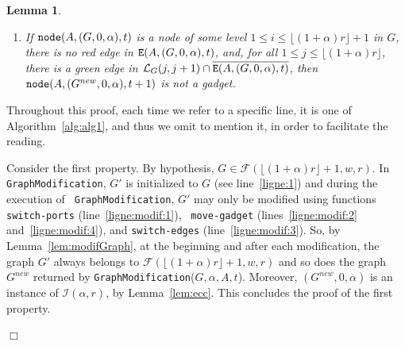 \documentclass[11pt]{article}
\newtheorem{lemma}{Lemma}[section]
\newcommand{\qed}{\hfill $\Box$ \bigbreak}
\newenvironment{proof}{\noindent {\bf Proof.}}{\qed}
\begin{document}
{\begin{lemma}
\begin{enumerate}
\item If ${\tt node}(A,(G,0,\alpha),t)$ is a node of some level
  $1\leq i\leq\lfloor(1+\alpha)r\rfloor+1$ in $G$, there is no red edge in ${\tt E}(A,(G,0,\alpha),t)$, and, for all $1\leq j \leq
  \lfloor(1+\alpha)r\rfloor$, there is a green edge in
  $\mathcal{L}_{G}(j,j+1)\cap\overline{{\tt E}(A,(G,0,\alpha),t)}$,
  then ${\tt node}(A,(G^{new},0,\alpha),t+1)$ is not a gadget.
\end{enumerate}
\end{lemma}

\begin{proof}
Throughout this proof, each time we refer to a specific line, it is one of Algorithm~\ref{alg:alg1}, and thus we
omit to mention it, in order to facilitate the reading.


  Consider the first property. By hypothesis,
  $G\in\mathcal{F}(\lfloor(1+\alpha)r\rfloor+1,w,r)$. In {\tt
    GraphModification}, $G'$ is initialized to $G$ (see
  line~\ref{ligne:1}) and during the execution of {\tt
    GraphModification}, $G'$ may only be modified using functions {\tt
    switch\mbox{-}ports} (line~\ref{ligne:modif:1}), {\tt
    move\mbox{-}gadget} (lines~\ref{ligne:modif:2}
  and~\ref{ligne:modif:4}), and {\tt switch\mbox{-}edges}
  (line~\ref{ligne:modif:3}). So, by Lemma~\ref{lem:modifGraph}, at the beginning and after each modification, the graph $G'$ always belongs to $\mathcal{F}(\lfloor(1+\alpha)r\rfloor+1,w,r)$ and so does the graph $G^{new}$ returned by {\tt GraphModification}($G,\alpha,A,t$). Moreover, $(G^{new},0,\alpha)$ is an instance
  of $\mathcal{I}(\alpha,r)$, by Lemma~\ref{lem:ecc}. This concludes
  the proof of the first property.


\end{proof}}
\end{document}
